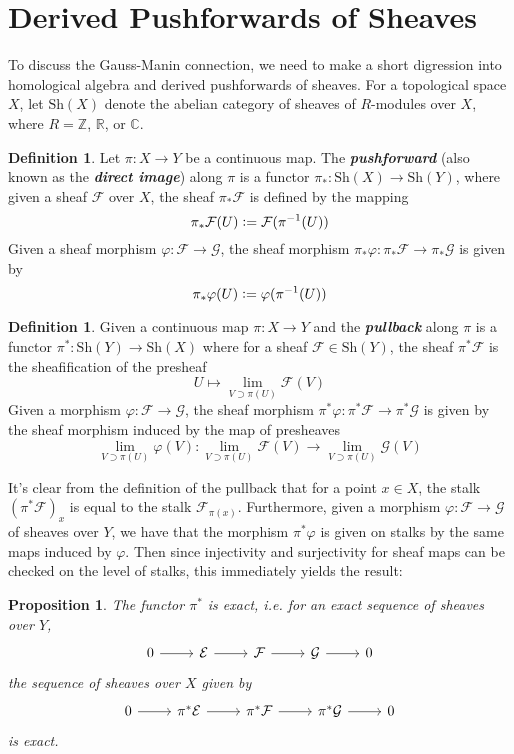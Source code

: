\documentclass[psamsfonts, 12pt]{amsart}
\newtheorem{prop}[thm]{Proposition}
\theoremstyle{definition}
\newtheorem{defn}[thm]{Definition}
\theoremstyle{remark}
\newcommand{\R}{\mathbb{R}}
\newcommand{\ib}[1]{\textbf{\textit{#1}}}
\newcommand{\Z}{\mathbb{Z}}
\newcommand{\C}{\mathbb{C}}
\newcommand{\inv}{^{-1}}
\newcommand{\defeq}{\vcentcolon=}
\begin{document}
\section{Derived Pushforwards of Sheaves}
%
To discuss the Gauss-Manin connection, we need to make a short digression into
homological algebra and derived pushforwards of sheaves. For a topological space
$X$, let $\mathrm{Sh}(X)$ denote the abelian category of sheaves of $R$-modules over
$X$, where $R = \Z$, $\R$, or $\C$.
%
\begin{defn}
Let $\pi : X \to Y$ be a continuous map. The \ib{pushforward} (also known as the
\ib{direct image}) along $\pi$ is a functor $\pi_* : \mathrm{Sh}(X) \to \mathrm{Sh}(Y)$,
where given a sheaf $\mathcal{F}$ over $X$, the sheaf $\pi_*\mathcal{F}$ is defined by
the mapping
\[
\pi_*\mathcal{F}(U) \defeq \mathcal{F}(\pi\inv(U))
\]
Given a sheaf morphism $\varphi : \mathcal{F} \to \mathcal{G}$, the sheaf morphism
$\pi_*\varphi : \pi_*\mathcal{F} \to \pi_*\mathcal{G}$ is given by
\[
\pi_*\varphi(U) \defeq \varphi(\pi\inv(U))
\]
\end{defn}
%
\begin{defn}
Given a continuous map $\pi: X \to Y$ and the \ib{pullback} along $\pi$ is a functor
$\pi^* : \mathrm{Sh}(Y) \to \mathrm{Sh}(X)$ where for a sheaf
$\mathcal{F} \in \mathrm{Sh}(Y)$, the sheaf $\pi^*\mathcal{F}$ is the
sheafification of the presheaf
\[
U \mapsto \lim_{V \supset \pi(U)} \mathcal{F}(V)
\]
Given a morphism $\varphi : \mathcal{F} \to \mathcal{G}$, the sheaf morphism
$\pi^*\varphi : \pi^*\mathcal{F} \to \pi^*\mathcal{G}$ is given by the sheaf
morphism induced by the map of presheaves
\[
\lim_{V \supset \pi(U)} \varphi(V) :
\lim_{V \supset \pi(U)} \mathcal{F}(V) \to \lim_{V \supset \pi(U)} \mathcal{G}(V)
\]
\end{defn}
%
It's clear from the definition of the pullback that for a point
$x \in X$, the stalk $(\pi^*\mathcal{F})_x$ is equal to the stalk
$\mathcal{F}_{\pi(x)}$. Furthermore, given a morphism
$\varphi : \mathcal{F} \to \mathcal{G}$ of sheaves over $Y$, we have that the
morphism $\pi^*\varphi$ is given on stalks by the same maps induced by $\varphi$.
Then since injectivity and surjectivity for sheaf maps can be checked on the level
of stalks, this immediately yields the result:
%
\begin{prop}
The functor $\pi^*$ is exact, i.e. for an exact sequence of sheaves over $Y$,
\[\begin{tikzcd}
0 \ar[r] & \mathcal{E} \ar[r] & \mathcal{F} \ar[r] & \mathcal{G} \ar[r] & 0
\end{tikzcd}\]
the sequence  of sheaves over $X$ given by
\[\begin{tikzcd}
0\ar[r]& \pi^*\mathcal{E} \ar[r] & \pi^*\mathcal{F} \ar[r] & \pi^*\mathcal{G} \ar[r]&0
\end{tikzcd}\]
is exact.
\end{prop}
\end{document}
